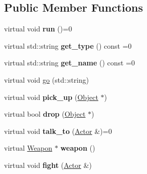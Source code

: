 \subsection*{Public Member Functions}
\begin{DoxyCompactItemize}
\item 
\hypertarget{classda__game_1_1Actor_a4e1570c1f5ee72efaf2f17309e491d7e}{
virtual void {\bfseries run} ()=0}
\label{classda__game_1_1Actor_a4e1570c1f5ee72efaf2f17309e491d7e}

\item 
\hypertarget{classda__game_1_1Actor_adecbdf29f9cb31095b6b32fdf99dc72a}{
virtual std::string {\bfseries get\_\-type} () const =0}
\label{classda__game_1_1Actor_adecbdf29f9cb31095b6b32fdf99dc72a}

\item 
\hypertarget{classda__game_1_1Actor_a53656847acff24bc249e507d31909b86}{
virtual std::string {\bfseries get\_\-name} () const =0}
\label{classda__game_1_1Actor_a53656847acff24bc249e507d31909b86}

\item 
virtual void \hyperlink{classda__game_1_1Actor_a6be7923ecbacabf779eda60f1f78bb72}{go} (std::string)
\item 
\hypertarget{classda__game_1_1Actor_ac00094ad57edec1218e2c40008e8177a}{
virtual void {\bfseries pick\_\-up} (\hyperlink{classda__game_1_1Object}{Object} $\ast$)}
\label{classda__game_1_1Actor_ac00094ad57edec1218e2c40008e8177a}

\item 
\hypertarget{classda__game_1_1Actor_a412f9a1ef89acffa948e92434179143d}{
virtual bool {\bfseries drop} (\hyperlink{classda__game_1_1Object}{Object} $\ast$)}
\label{classda__game_1_1Actor_a412f9a1ef89acffa948e92434179143d}

\item 
\hypertarget{classda__game_1_1Actor_a4106856b26e95ba76708da5b0e497cc7}{
virtual void {\bfseries talk\_\-to} (\hyperlink{classda__game_1_1Actor}{Actor} \&)=0}
\label{classda__game_1_1Actor_a4106856b26e95ba76708da5b0e497cc7}

\item 
\hypertarget{classda__game_1_1Actor_ae7194d1dba4026c8333f9bc12041ce84}{
virtual \hyperlink{classda__game_1_1Weapon}{Weapon} $\ast$ {\bfseries weapon} ()}
\label{classda__game_1_1Actor_ae7194d1dba4026c8333f9bc12041ce84}

\item 
\hypertarget{classda__game_1_1Actor_a54f63c010e082f31dc3cbdbbfb7238e1}{
virtual void {\bfseries fight} (\hyperlink{classda__game_1_1Actor}{Actor} \&)}
\label{classda__game_1_1Actor_a54f63c010e082f31dc3cbdbbfb7238e1}

\end{DoxyCompactItemize}
